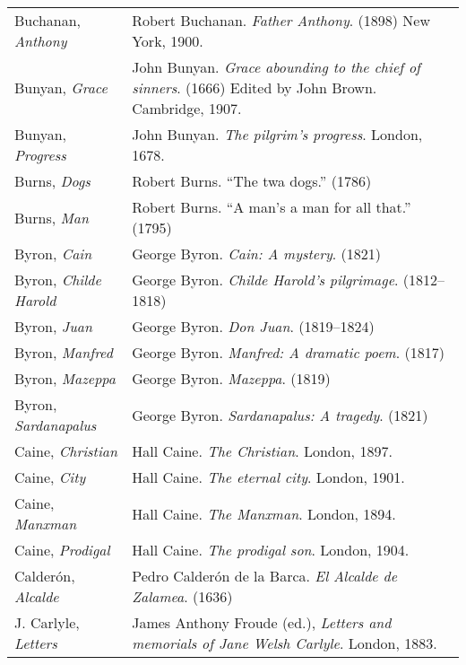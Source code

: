 \begin{longtable}{p{} p{}}
Buchanan, \textit{Anthony} & Robert Buchanan. \textit{Father Anthony}. (1898) New York, 1900. \\ %

Bunyan, \textit{Grace} & John Bunyan. \textit{Grace abounding to the chief of sinners}. (1666) Edited by John Brown. Cambridge, 1907. \\
Bunyan, \textit{Progress} & John Bunyan. \textit{The pilgrim's progress}. London, 1678. \\

Burns, \textit{Dogs} & Robert Burns. ``The twa dogs.'' (1786) \\
Burns, \textit{Man} & Robert Burns. ``A man's a man for all that.'' (1795) \\

Byron, \textit{Cain} & George Byron. \textit{Cain: A mystery}. (1821) \\
Byron, \textit{Childe Harold} & George Byron. \textit{Childe Harold's pilgrimage}. (1812--1818) \\
Byron, \textit{Juan} & George Byron. \textit{Don Juan}. (1819–1824) \\
Byron, \textit{Manfred} & George Byron. \textit{Manfred: A dramatic poem}. (1817) \\
Byron, \textit{Mazeppa} & George Byron. \textit{Mazeppa}. (1819) \\
Byron, \textit{Sardanapalus} & George Byron. \textit{Sardanapalus: A tragedy}. (1821) \\

Caine, \textit{Christian} & Hall Caine. \textit{The Christian}. London, 1897.  \\
Caine, \textit{City} & Hall Caine. \textit{The eternal city}. London, 1901. \\
Caine, \textit{Manxman} & Hall Caine. \textit{The Manxman}. London, 1894. \\
Caine, \textit{Prodigal} & Hall Caine. \textit{The prodigal son}. London, 1904. \\

Calderón, \textit{Alcalde} & Pedro Calderón de la Barca. \textit{El Alcalde de Zalamea}. (1636) \\

J. Carlyle, \textit{Letters} & James Anthony Froude (ed.), \textit{Letters and memorials of Jane Welsh Carlyle}. London, 1883. \\ %


\end{longtable}

